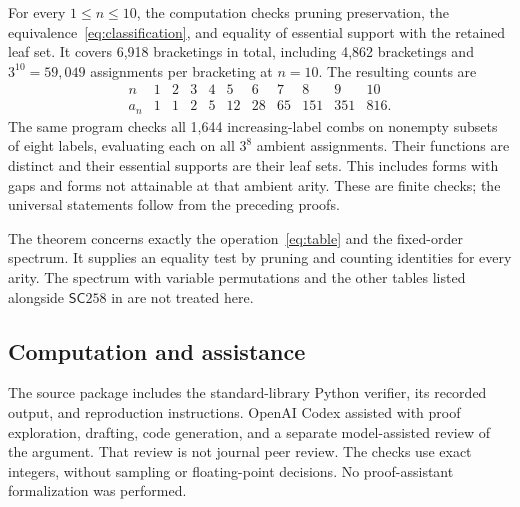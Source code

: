 \documentclass[11pt]{amsart}
\newcommand{\SC}{\mathsf{SC}258}
\begin{document}
For every \(1\leq n\leq10\), the computation checks pruning preservation,
the equivalence~\eqref{eq:classification}, and equality of essential
support with the retained leaf set. It covers 6,918 bracketings in total,
including 4,862 bracketings and \(3^{10}=59,049\) assignments per bracketing
at \(n=10\). The resulting counts are
\[
\begin{array}{c|rrrrrrrrrr}
 n&1&2&3&4&5&6&7&8&9&10\\\hline
 a_n&1&1&2&5&12&28&65&151&351&816.
\end{array}
\]
The same program checks all 1,644 increasing-label combs on nonempty
subsets of eight labels, evaluating each on all \(3^8\) ambient
assignments. Their functions are distinct and their essential supports
are their leaf sets. This includes forms with gaps and forms not attainable
at that ambient arity. These are finite checks; the universal statements
follow from the preceding proofs.

The theorem concerns exactly the operation~\eqref{eq:table} and the
fixed-order spectrum. It supplies an equality test by pruning and counting
identities for every arity. The spectrum with variable permutations and
the other tables listed alongside \(\SC\) in
\cite[Section~7]{HuangLehtonen2024} are not treated here.

\subsection*{Computation and assistance}
The source package includes the standard-library Python verifier, its
recorded output, and reproduction instructions. OpenAI Codex assisted with
proof exploration, drafting, code generation, and a separate model-assisted
review of the argument. That review is not journal peer review. The checks
use exact integers, without sampling or floating-point decisions. No
proof-assistant formalization was performed.



\end{document}
